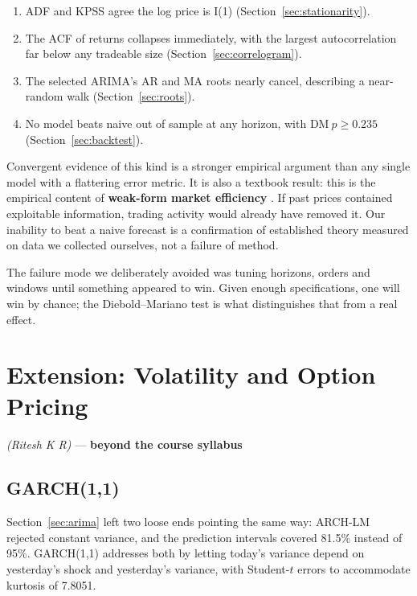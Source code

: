\documentclass[12pt,a4paper]{article}
\begin{document}
\begin{enumerate}
\item ADF and KPSS \cite{kpss1992} agree the log price is I(1)
      (Section~\ref{sec:stationarity}).
\item The ACF of returns collapses immediately, with the largest autocorrelation
      far below any tradeable size (Section~\ref{sec:correlogram}).
\item The selected ARIMA's AR and MA roots nearly cancel, describing a
      near-random walk (Section~\ref{sec:roots}).
\item No model beats naive out of sample at any horizon, with
      $\mathrm{DM}\ p \geq 0.235$ (Section~\ref{sec:backtest}).
\end{enumerate}

Convergent evidence of this kind is a stronger empirical argument than any single
model with a flattering error metric. It is also a textbook result: this is the
empirical content of \textbf{weak-form market efficiency} \cite{fama1970}. If past
prices contained exploitable information, trading activity would already have
removed it. Our inability to beat a naive forecast is a confirmation of
established theory measured on data we collected ourselves, not a failure of
method.

The failure mode we deliberately avoided was tuning horizons, orders and windows
until something appeared to win. Given enough specifications, one will win by
chance; the Diebold--Mariano test is what distinguishes that from a real effect.

\section{Extension: Volatility and Option Pricing}
\label{sec:garch}

\emph{(Ritesh K R)} --- \textbf{beyond the course syllabus}

\subsection{GARCH(1,1)}

Section~\ref{sec:arima} left two loose ends pointing the same way: ARCH-LM
rejected constant variance, and the prediction intervals covered 81.5\% instead
of 95\%. GARCH(1,1) \cite{bollerslev1986} addresses both by letting today's
variance depend on yesterday's shock and yesterday's variance, with Student-$t$
errors to accommodate kurtosis of 7.8051.
\end{document}
